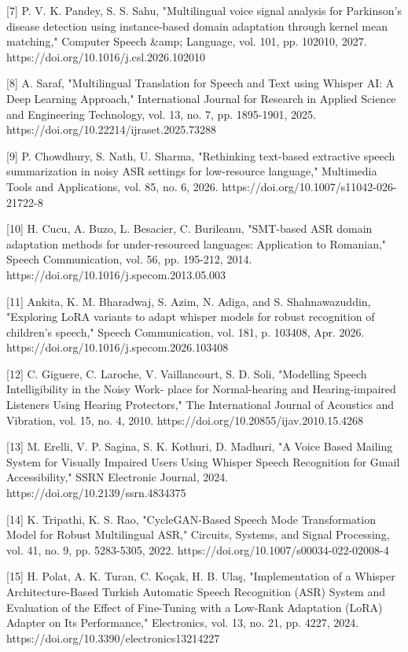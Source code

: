 \documentclass[12pt,a4paper]{article}
\begin{document}
[7] P. V. K. Pandey, S. S. Sahu, "Multilingual voice signal analysis for Parkinson’s disease detection using instance-based domain adaptation through kernel mean matching," Computer Speech \&amp; Language, vol. 101, pp. 102010, 2027. https://doi.org/10.1016/j.csl.2026.102010


[8] A. Saraf, "Multilingual Translation for Speech and Text using Whisper AI: A Deep Learning Approach," International Journal for Research in Applied Science and Engineering Technology, vol. 13, no. 7, pp. 1895-1901, 2025. https://doi.org/10.22214/ijraset.2025.73288


[9] P. Chowdhury, S. Nath, U. Sharma, "Rethinking text-based extractive speech summarization in noisy ASR settings for low-resource language," Multimedia Tools and Applications, vol. 85, no. 6, 2026. https://doi.org/10.1007/s11042-026-21722-8


[10] H. Cucu, A. Buzo, L. Besacier, C. Burileanu, "SMT-based ASR domain adaptation methods for under-resourced languages: Application to Romanian," Speech Communication, vol. 56, pp. 195-212, 2014. https://doi.org/10.1016/j.specom.2013.05.003


[11] Ankita, K. M. Bharadwaj, S. Azim, N. Adiga, and S. Shahnawazuddin, "Exploring LoRA variants to adapt whisper models for robust recognition of children’s speech," Speech Communication, vol. 181, p. 103408, Apr. 2026. https://doi.org/10.1016/j.specom.2026.103408


[12] C. Giguere, C. Laroche, V. Vaillancourt, S. D. Soli, "Modelling Speech Intelligibility in the Noisy Work- place for Normal-hearing and Hearing-impaired Listeners Using Hearing Protectors," The International Journal of Acoustics and Vibration, vol. 15, no. 4, 2010. https://doi.org/10.20855/ijav.2010.15.4268


[13] M. Erelli, V. P. Sagina, S. K. Kothuri, D. Madhuri, "A Voice Based Mailing System for Visually Impaired Users Using Whisper Speech Recognition for Gmail Accessibility," SSRN Electronic Journal, 2024. https://doi.org/10.2139/ssrn.4834375


[14] K. Tripathi, K. S. Rao, "CycleGAN-Based Speech Mode Transformation Model for Robust Multilingual ASR," Circuits, Systems, and Signal Processing, vol. 41, no. 9, pp. 5283-5305, 2022. https://doi.org/10.1007/s00034-022-02008-4


[15] H. Polat, A. K. Turan, C. Koçak, H. B. Ulaş, "Implementation of a Whisper Architecture-Based Turkish Automatic Speech Recognition (ASR) System and Evaluation of the Effect of Fine-Tuning with a Low-Rank Adaptation (LoRA) Adapter on Its Performance," Electronics, vol. 13, no. 21, pp. 4227, 2024. https://doi.org/10.3390/electronics13214227
\end{document}
